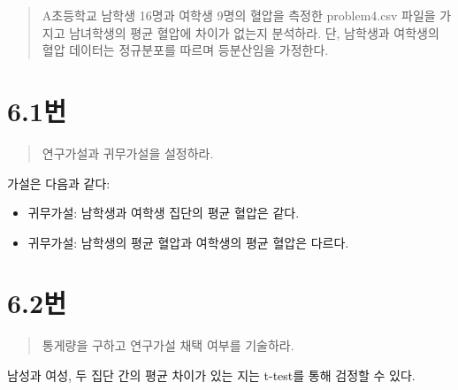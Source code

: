 \documentclass[
  letterpaper,
  DIV=11,
  numbers=noendperiod]{scrreprt}
\newenvironment{Shaded}{\begin{snugshade}}{\end{snugshade}}
\newcommand{\AttributeTok}[1]{\textcolor[rgb]{0.40,0.45,0.13}{#1}}
\newcommand{\ConstantTok}[1]{\textcolor[rgb]{0.56,0.35,0.01}{#1}}
\newcommand{\FunctionTok}[1]{\textcolor[rgb]{0.28,0.35,0.67}{#1}}
\newcommand{\NormalTok}[1]{\textcolor[rgb]{0.00,0.23,0.31}{#1}}
\newcommand{\OtherTok}[1]{\textcolor[rgb]{0.00,0.23,0.31}{#1}}
\newcommand{\SpecialCharTok}[1]{\textcolor[rgb]{0.37,0.37,0.37}{#1}}
\newcommand{\StringTok}[1]{\textcolor[rgb]{0.13,0.47,0.30}{#1}}
\providecommand{\tightlist}{%
  \setlength{\itemsep}{0pt}\setlength{\parskip}{0pt}}\usepackage{longtable,booktabs,array}
\begin{document}
\begin{quote}
A초등학교 남학생 16명과 여학생 9명의 혈압을 측정한 problem4.csv 파일을
가지고 남녀학생의 평균 혈압에 차이가 없는지 분석하라. 단, 남학생과
여학생의 혈압 데이터는 정규분포를 따르며 등분산임을 가정한다.
\end{quote}

\hypertarget{uxbc88-33}{%
\chapter*{6.1번}\label{uxbc88-33}}


\begin{quote}
연구가설과 귀무가설을 설정하라.
\end{quote}

가설은 다음과 같다:

\begin{itemize}
\tightlist
\item
  귀무가설: 남학생과 여학생 집단의 평균 혈압은 같다.
\item
  귀무가설: 남학생의 평균 혈압과 여학생의 평균 혈압은 다르다.
\end{itemize}

\hypertarget{uxbc88-34}{%
\chapter*{6.2번}\label{uxbc88-34}}


\begin{quote}
통게량을 구하고 연구가설 채택 여부를 기술하라.
\end{quote}

남성과 여성, 두 집단 간의 평균 차이가 있는 지는 t-test를 통해 검정할 수
있다.

\begin{Shaded}
\end{Shaded}
\end{document}
